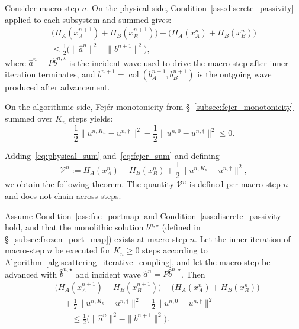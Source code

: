 Consider macro-step $n$. On the physical side, Condition~\ref{ass:discrete_passivity} applied to each subsystem and summed gives:
\begin{equation}
\begin{aligned}
\big(H_A(x_A^{n+1}) + H_B(x_B^{n+1})\big) - \big(H_A(x_A^n) + H_B(x_B^n)\big)\\
\leq \frac{1}{2}\big(\|\hat{a}^n\|^2 - \|b^{n+1}\|^2\big),
\label{eq:physical_sum}
\end{aligned}
\end{equation}
where $\hat{a}^n = P \hat{b}^{n,\star}$ is the incident wave used to drive the macro-step after inner iteration terminates, and $b^{n+1} = \operatorname{col}(b_A^{n+1}, b_B^{n+1})$ is the outgoing wave produced after advancement.

On the algorithmic side, Fejér monotonicity from \S~\ref{subsec:fejer_monotonicity} summed over $K_n$ steps yields:
\begin{equation}
\frac{1}{2}\|u^{n,K_n} - u^{n,\dagger}\|^2 - \frac{1}{2}\|u^{n,0} - u^{n,\dagger}\|^2 \leq 0.
\label{eq:fejer_sum}
\end{equation}

Adding~\eqref{eq:physical_sum} and~\eqref{eq:fejer_sum} and defining
\begin{equation}
\mathcal{V}^n := H_A(x_A^n) + H_B(x_B^n) + \frac{1}{2}\|u^{n,K_n} - u^{n,\dagger}\|^2,
\label{eq:augmented_storage_def}
\end{equation}
we obtain the following theorem. The quantity $\mathcal{V}^n$ is defined per macro-step $n$ and does not chain across steps.

\begin{theorem}
\label{thm:augmented_storage}
Assume Condition~\ref{ass:fne_portmap} and Condition~\ref{ass:discrete_passivity} hold, and that the monolithic solution $b^{n,\star}$ (defined in \S~\ref{subsec:frozen_port_map}) exists at macro-step $n$. Let the inner iteration of macro-step $n$ be executed for $K_n \geq 0$ steps according to Algorithm~\ref{alg:scattering_iterative_coupling}, and let the macro-step be advanced with $\hat{b}^{n,\star}$ and incident wave $\hat{a}^n = P \hat{b}^{n,\star}$. Then
\begin{equation}
\begin{aligned}
&\big(H_A(x_A^{n+1}) + H_B(x_B^{n+1})\big) - \big(H_A(x_A^n) + H_B(x_B^n)\big) \\
&\quad + \frac{1}{2}\|u^{n,K_n} - u^{n,\dagger}\|^2 - \frac{1}{2}\|u^{n,0} - u^{n,\dagger}\|^2 \\
&\qquad \leq \frac{1}{2}\big(\|\hat{a}^n\|^2 - \|b^{n+1}\|^2\big).
\end{aligned}
\label{eq:augmented_storage_inequality}
\end{equation}
\end{theorem}

